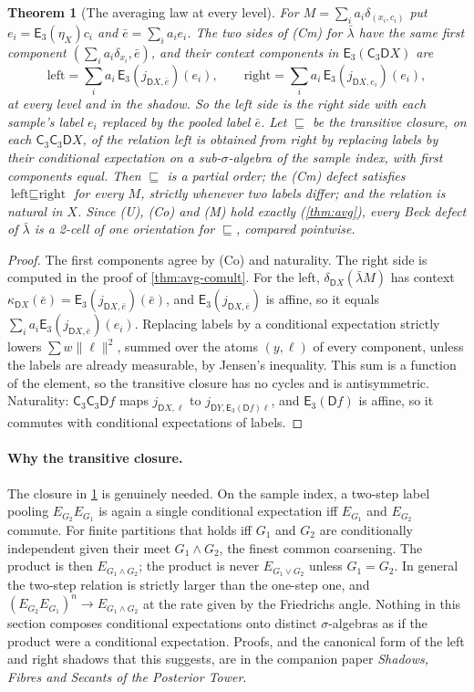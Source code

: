 \documentclass[11pt]{article}
\newtheorem{theorem}{Theorem}[section]
\theoremstyle{definition}
\theoremstyle{remark}
\newcommand{\D}{\mathsf{D}}
\newcommand{\C}{\mathsf{C}}
\newcommand{\E}{\mathsf{E}}
\newcommand{\lb}{\bar\lambda}
\begin{document}
\begin{theorem}[The averaging law at every level]\label{thm:avg-all-levels}
For $M=\sum_ia_i\delta_{(x_i,c_i)}$ put $e_i=\E_3(\eta_X)c_i$ and $\bar e=\sum_ia_ie_i$. The two sides of (Cm) for $\lb$ have the same
first component $(\sum_ia_i\delta_{x_i},\bar e)$, and their context components in $\E_3(\C_3\D X)$ are
\[
\text{left}=\sum_ia_i\,\E_3(j_{\D X,\bar e})(e_i),\qquad \text{right}=\sum_ia_i\,\E_3(j_{\D X,e_i})(e_i),
\]
at every level and in the shadow. So the left side is the right side with each sample's label $e_i$ replaced by the pooled label
$\bar e$. Let $\sqsubseteq$ be the transitive closure, on each $\C_3\C_3\D X$, of the relation \emph{left is obtained from right by
replacing labels by their conditional expectation on a sub-$\sigma$-algebra of the sample index}, with first components equal. Then
$\sqsubseteq$ is a partial order; the (Cm) defect satisfies $\text{left}\sqsubseteq\text{right}$ for every $M$, strictly whenever two
labels differ; and the relation is natural in $X$. Since (U), (Co) and (M) hold exactly (\cref{thm:avg}), every Beck defect of $\lb$
is a 2-cell of one orientation for $\sqsubseteq$, compared pointwise.
\end{theorem}
\begin{proof}
The first components agree by (Co) and naturality. The right side is computed in the proof of \cref{thm:avg-comult}. For the left,
$\delta_{\D X}(\lb M)$ has context $\kappa_{\D X}(\bar e)=\E_3(j_{\D X,\bar e})(\bar e)$, and $\E_3(j_{\D X,\bar e})$ is affine, so it equals
$\sum_ia_i\E_3(j_{\D X,\bar e})(e_i)$. Replacing labels by a conditional expectation strictly lowers $\sum w\lVert\ell\rVert^2$,
summed over the atoms $(y,\ell)$ of every component, unless the labels are already measurable, by Jensen's inequality. This sum is a
function of the element, so the transitive closure has no cycles and is antisymmetric. Naturality: $\C_3\C_3\D f$ maps $j_{\D X,\ell}$
to $j_{\D Y,\E_3(\D f)\ell}$, and $\E_3(\D f)$ is affine, so it commutes with conditional expectations of labels.
\end{proof}

\paragraph{Why the transitive closure.} The closure in \cref{thm:avg-all-levels} is genuinely needed. On the sample index, a two-step
label pooling $E_{G_2}E_{G_1}$ is again a single conditional expectation iff $E_{G_1}$ and $E_{G_2}$ commute. For finite partitions
that holds iff $G_1$ and $G_2$ are conditionally independent given their meet $G_1\wedge G_2$, the finest common coarsening. The
product is then $E_{G_1\wedge G_2}$; the product is never $E_{G_1\vee G_2}$ unless $G_1=G_2$. In general the two-step relation is
strictly larger than the one-step one, and $(E_{G_2}E_{G_1})^n\to E_{G_1\wedge G_2}$ at the rate given by the Friedrichs angle. Nothing
in this section composes conditional expectations onto distinct $\sigma$-algebras as if the product were a conditional expectation.
Proofs, and the canonical form of the left and right shadows that this suggests, are in the companion paper \emph{Shadows, Fibres
and Secants of the Posterior Tower}.
\end{document}
